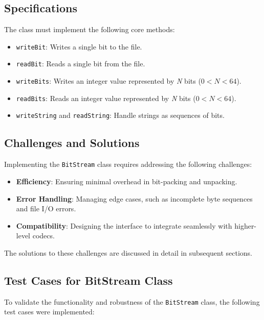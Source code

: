 \documentclass[11pt,twoside,a4paper]{report}
\begin{document}
\subsection{Specifications}
The class must implement the following core methods:
\begin{itemize}
    \item \texttt{writeBit}: Writes a single bit to the file.
    \item \texttt{readBit}: Reads a single bit from the file.
    \item \texttt{writeBits}: Writes an integer value represented by \textit{N} bits (\(0 < N < 64\)).
    \item \texttt{readBits}: Reads an integer value represented by \textit{N} bits (\(0 < N < 64\)).
    \item \texttt{writeString} and \texttt{readString}: Handle strings as sequences of bits.
\end{itemize}

\subsection{Challenges and Solutions}
Implementing the \texttt{BitStream} class requires addressing the following challenges:
\begin{itemize}
    \item \textbf{Efficiency}: Ensuring minimal overhead in bit-packing and unpacking.
    \item \textbf{Error Handling}: Managing edge cases, such as incomplete byte sequences and file I/O errors.
    \item \textbf{Compatibility}: Designing the interface to integrate seamlessly with higher-level codecs.
\end{itemize}

The solutions to these challenges are discussed in detail in subsequent sections.

\subsection{Test Cases for BitStream Class}

To validate the functionality and robustness of the \texttt{BitStream} class, the following test cases were implemented:
\end{document}
